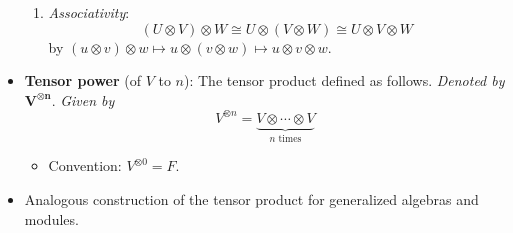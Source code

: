 \documentclass[../notes.tex]{subfiles}
\begin{document}
\begin{itemize}
\begin{enumerate}
        \item \emph{Associativity}:
        \begin{equation*}
            (U\otimes V)\otimes W \cong U\otimes(V\otimes W) \cong U\otimes V\otimes W
        \end{equation*}
        by $(u\otimes v)\otimes w\mapsto u\otimes(v\otimes w)\mapsto u\otimes v\otimes w$.
    \end{enumerate}
    \item \textbf{Tensor power} (of $V$ to $n$): The tensor product defined as follows. \emph{Denoted by} $\bm{V^{\otimes n}}$. \emph{Given by}
    \begin{equation*}
        V^{\otimes n} = \underbrace{V\otimes\cdots\otimes V}_{n\text{ times}}
    \end{equation*}
    \begin{itemize}
        \item Convention: $V^{\otimes 0}=F$.
    \end{itemize}
    \item Analogous construction of the tensor product for generalized algebras and modules.
\end{itemize}
\end{document}
